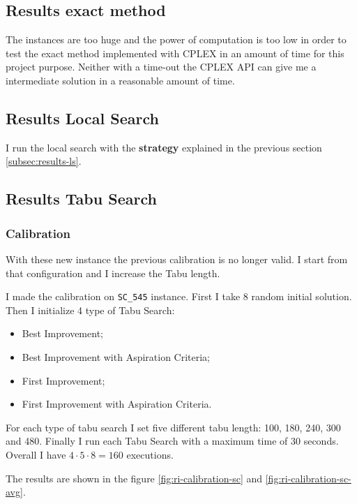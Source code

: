 	
	
	\subsection{Results exact method}
		The instances are too huge and the power of computation is too low in order to test the exact method implemented with CPLEX in an amount of time for this project purpose. Neither with a time-out the CPLEX API can give me a intermediate solution in a reasonable amount of time.
		
	\newpage
	
	\subsection{Results Local Search}
		I run the local search with the \textbf{strategy} explained in the previous section \ref{subsec:results-ls}.
		
		
	
	
	\newpage
	
	\subsection{Results Tabu Search}
	
		\subsubsection{Calibration}
			With these new instance the previous calibration is no longer valid. I start from that configuration and I increase the Tabu length.
			
			I made the calibration on \verb|SC_545| instance.
			First I take 8 random initial solution. Then I initialize 4 type of Tabu Search:
			\begin{itemize}
				\item Best Improvement;
				\item Best Improvement with Aspiration Criteria;
				\item First Improvement;
				\item First Improvement with Aspiration Criteria.
			\end{itemize}
			For each type of tabu search I set five different tabu length: 100, 180, 240, 300 and 480. Finally I run each Tabu Search with a maximum time of 30 seconds.  Overall I have $4 \cdot 5 \cdot 8 = 160 $ executions. 
			
			The results are shown in the figure \ref{fig:ri-calibration-sc} and \ref{fig:ri-calibration-sc-avg}.
			
